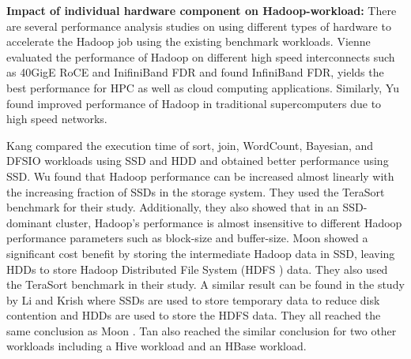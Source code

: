 \documentclass[conference]{IEEEtran}
\begin{document}

\textbf{Impact of individual hardware component on Hadoop-workload:}
There are several performance analysis studies on using different types of hardware to accelerate the Hadoop job using the existing benchmark workloads. 
Vienne \cite{ethib:vienne} evaluated the performance of Hadoop on different high speed interconnects such as 40GigE RoCE and InifiniBand FDR and found InfiniBand FDR, yields the best performance for HPC as well as cloud computing applications. 
Similarly, Yu \cite{ethib:yu} found improved performance of Hadoop in traditional supercomputers due to high speed networks. 

Kang \cite{ssdhdd:kang} compared the execution time of sort, join, WordCount, Bayesian, and DFSIO workloads using SSD and HDD and obtained better performance using SSD. 
Wu \cite{ssdhdd:wu} found that Hadoop performance can be increased almost linearly with the increasing fraction of SSDs in the storage system. They used the TeraSort benchmark for their study. Additionally, they also showed that in an SSD-dominant cluster, Hadoop's performance is almost insensitive to different Hadoop performance parameters such as block-size and buffer-size. 
Moon \cite{ssdhdd:moon} showed a significant cost benefit by storing the intermediate Hadoop data in SSD, leaving HDDs to store Hadoop Distributed File System (HDFS \cite{fw:hdfs}) data. They also used the TeraSort benchmark in their study. 
A similar result can be found in the study by Li \cite{ssdhdd:li} and Krish \cite{ssdhdd:krish} where SSDs are used to store temporary data to reduce disk contention and HDDs are used to store the HDFS data. They all reached the same conclusion as Moon \cite{ssdhdd:moon}.  
Tan \cite{ssdhdd:tan} also reached the similar conclusion for two other workloads including a Hive workload and an HBase workload. 
\end{document}
